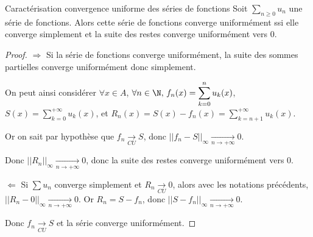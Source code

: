 \begin{proposition}{Caractérisation convergence uniforme des séries de fonctions}{}
    Soit $\displaystyle \sum_{n \geqslant 0} u_n$ une série de fonctions. Alors 
    cette série de fonctions converge uniformément ssi elle converge simplement et
    la suite des restes converge uniformément vers $0$. 
\end{proposition}


\begin{proof}
    $\Rightarrow$ Si la série de fonctions converge uniformément, la suite des sommes partielles converge 
    uniformément donc simplement. 

    On peut ainsi considérer $\forall x \in A$, $\forall n \in \N, \, f_n(x) = \displaystyle \sum_{k = 0}^n u_k(x)$, 
    $\displaystyle S(x) = \sum_{k = 0}^{ + \infty } u_k(x)$, et $\displaystyle R_n(x) = S(x) - f_n(x) = \sum_{k = n + 1}^{ + \infty } u_k(x)$.

    Or on sait par hypothèse que $f_n \xrightarrow[CU]{} S$, donc $||f_n - S||_{\infty} \xrightarrow[n\to +\infty]{} 0$.

    Donc $\displaystyle || R_n ||_{\infty} \xrightarrow[n\to +\infty]{} 0$, donc la suite des restes converge uniformément vers $0$.


    \lvspace   $\Leftarrow$ Si $\displaystyle \sum u_n$ converge simplement et $R_n \xrightarrow[CU]{} 0$, alors avec les notations
    précédents, $||R_n - 0 ||_{\infty} \xrightarrow[n\to +\infty]{} 0$. Or $R_n = S - f_n$, donc $|| S - f_n ||_{\infty} \xrightarrow[n\to +\infty]{} 0$.

    Donc $f_n \xrightarrow[CU]{} S$ et la série converge uniformément.
\end{proof}

